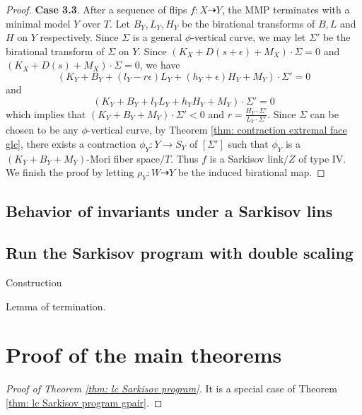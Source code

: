 \documentclass[11pt]{amsart}
\numberwithin{equation}{section}
\theoremstyle{definition}
\theoremstyle{definition}
\theoremstyle{definition}
\begin{document}
\begin{proof}
\noindent\textbf{Case 3.3}. After a sequence of flips $f: X\dashrightarrow Y$, the MMP terminates with a minimal model $Y$ over $T$. Let $B_Y,L_Y,H_Y$ be the birational transforms of $B,L$ and $H$ on $Y$ respectively. Since $\Sigma$ is a general $\phi$-vertical curve, we may let $\Sigma'$ be the birational transform of $\Sigma$ on $Y$. Since $(K_{X}+D(s+\epsilon)+M_X)\cdot\Sigma=0$ and $(K_{X}+D(s)+M_X)\cdot\Sigma=0$, we have
$$(K_Y+B_Y+(l_Y-r\epsilon)L_Y+(h_Y+\epsilon)H_Y+M_Y)\cdot\Sigma'=0$$
and
$$(K_Y+B_Y+l_YL_Y+h_YH_Y+M_Y)\cdot\Sigma'=0$$
which implies that $(K_Y+B_Y+M_Y)\cdot\Sigma'<0$ and $r=\frac{H_Y\cdot\Sigma'}{L_Y\cdot\Sigma'}$. Since $\Sigma$ can be chosen to be any $\phi$-vertical curve, by Theorem \ref{thm: contraction extremal face glc}, there exists a contraction $\phi_Y:Y\rightarrow S_Y$ of $[\Sigma']$ such that $\phi_Y$ is a $(K_Y+B_Y+M_Y)$-Mori fiber space$/T$. Thus $f$ is a Sarkisov link$/Z$ of type IV.  We finish the proof by letting $\rho_Y: W\dashrightarrow Y$ be the induced birational map.
\end{proof}

\subsection{Behavior of invariants under a Sarkisov lins}

\subsection{Run the Sarkisov program with double scaling}

Construction

Lemma of termination.

\section{Proof of the main theorems}

\begin{proof}[Proof of Theorem \ref{thm: lc Sarkisov program}]
    It is a special case of Theorem \ref{thm: lc Sarkisov program gpair}.
\end{proof}
\end{document}
